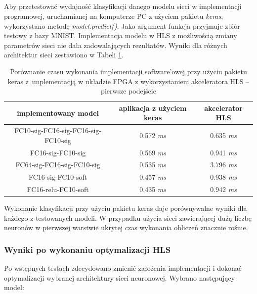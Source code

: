 \subsection{}

Aby przetestować wydajność klasyfikacji danego modelu sieci w implementacji programowej, uruchamianej na komputerze PC z użyciem pakietu \emph{keras}, wykorzystano metodę \emph{model.predict()}. Jako argument funkcja przyjmuje zbiór testowy z bazy MNIST.
Implementacja modelu w HLS z możliwością zmiany parametrów sieci nie dała zadowalających rezultatów. Wyniki dla różnych architektur sieci zestawiono w Tabeli \ref{tab:czas-wykonania}. 

\begin{table}[h] \centering
  \caption{Porównanie czasu wykonania implementacji software'owej przy użyciu pakietu keras z~implementacją w układzie FPGA z wykorzystaniem akceleratora HLS -- pierwsze podejście}
  \centering
  \begin{tabular} {c|c|c} \hline \label{tab:czas-wykonania}  
    implementowany model & aplikacja z użyciem keras & akcelerator HLS\\ \hline \hline
    FC10-sig-FC16-sig-FC16-sig-FC10-sig & 0.572 \emph{ms} & 0.635 \emph{ms} \\
    FC16-sig-FC10-sig & 0.569 \emph{ms} & 0.941 \emph{ms} \\
    FC64-sig-FC16-sig-FC10-sig & 0.535 \emph{ms} & 3.796 \emph{ms} \\
    FC16-sig-FC10-soft & 0.457 \emph{ms} & 0.938 \emph{ms} \\
    FC16-relu-FC10-soft & 0.435 \emph{ms} & 0.942 \emph{ms} \\
  \end{tabular}
\end{table}

Wykonanie klasyfikacji przy użyciu pakietu keras daje porównywalne wyniki dla każdego z testowanych modeli. W przypadku użycia sieci zawierającej dużą liczbę neuronów w pierwszej warstwie ukrytej czas wykonania obliczeń znacznie rośnie.


\subsubsection{Wyniki po wykonaniu optymalizacji HLS}
Po wstępnych testach zdecydowano zmienić założenia implementacji i dokonać optymalizacji wybranej architektury sieci neuronowej. Wybrano następujący model:

